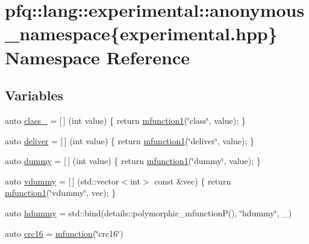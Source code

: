 \hypertarget{namespacepfq_1_1lang_1_1experimental_1_1anonymous__namespace_02experimental_8hpp_03}{\section{pfq\+:\+:lang\+:\+:experimental\+:\+:anonymous\+\_\+namespace\{experimental.\+hpp\} Namespace Reference}
\label{namespacepfq_1_1lang_1_1experimental_1_1anonymous__namespace_02experimental_8hpp_03}
}
\subsection*{Variables}
\begin{DoxyCompactItemize}
\item 
auto \hyperlink{namespacepfq_1_1lang_1_1experimental_1_1anonymous__namespace_02experimental_8hpp_03_a55ce0b220b42a47460d1d40d3d5fdd5d}{class\+\_\+} = \mbox{[}$\,$\mbox{]} (int value) \{ return \hyperlink{namespacepfq_1_1lang_a68d775c68562fbd0ab9ef213f2519499}{mfunction1}(\char`\"{}class\char`\"{}, value); \}
\item 
auto \hyperlink{namespacepfq_1_1lang_1_1experimental_1_1anonymous__namespace_02experimental_8hpp_03_aabd600ebf1ee62184fa0765f49f9f990}{deliver} = \mbox{[}$\,$\mbox{]} (int value) \{ return \hyperlink{namespacepfq_1_1lang_a68d775c68562fbd0ab9ef213f2519499}{mfunction1}(\char`\"{}deliver\char`\"{}, value); \}
\item 
auto \hyperlink{namespacepfq_1_1lang_1_1experimental_1_1anonymous__namespace_02experimental_8hpp_03_a5fc8274e9598b8524f833264174b62b7}{dummy} = \mbox{[}$\,$\mbox{]} (int value) \{ return \hyperlink{namespacepfq_1_1lang_a68d775c68562fbd0ab9ef213f2519499}{mfunction1}(\char`\"{}dummy\char`\"{}, value); \}
\item 
auto \hyperlink{namespacepfq_1_1lang_1_1experimental_1_1anonymous__namespace_02experimental_8hpp_03_a2226c8f9da114edfb9d457189dde1cbe}{vdummy} = \mbox{[}$\,$\mbox{]} (std\+::vector$<$int$>$ const \&vec) \{ return \hyperlink{namespacepfq_1_1lang_a68d775c68562fbd0ab9ef213f2519499}{mfunction1}(\char`\"{}vdummy\char`\"{}, vec); \}
\item 
auto \hyperlink{namespacepfq_1_1lang_1_1experimental_1_1anonymous__namespace_02experimental_8hpp_03_a6377eeaace811b051eaf2edffd4968f9}{hdummy} = std\+::bind(details\+::polymorphic\+\_\+mfunction\+P(), \char`\"{}hdummy\char`\"{}, \+\_)
\item 
auto \hyperlink{namespacepfq_1_1lang_1_1experimental_1_1anonymous__namespace_02experimental_8hpp_03_a8152d34c5c69cc26aaa2b4a14ed37af1}{crc16} = \hyperlink{namespacepfq_1_1lang_ac3ec84f09576bf5fb5db464623a4c165}{mfunction}(\char`\"{}crc16\char`\"{})
\end{DoxyCompactItemize}


